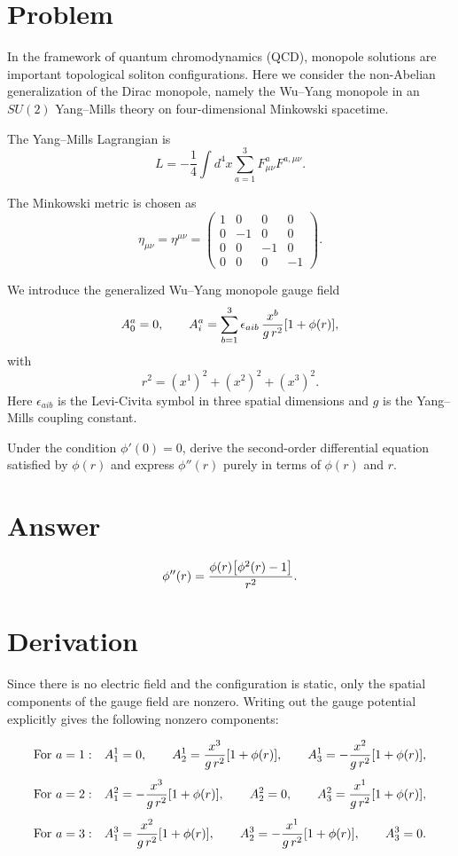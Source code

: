 \documentclass[12pt, a4paper]{article}
\begin{document}
\section*{Problem}

In the framework of quantum chromodynamics (QCD), monopole solutions are
important topological soliton configurations. Here we consider the non-Abelian
generalization of the Dirac monopole, namely the Wu--Yang monopole in an
$SU(2)$ Yang--Mills theory on four-dimensional Minkowski spacetime.

The Yang--Mills Lagrangian is
\[
L = -\frac{1}{4} \int d^4 x \sum_{a=1}^{3} F^a_{\mu\nu} F^{a,\mu\nu}.
\]

The Minkowski metric is chosen as
\[
\eta_{\mu\nu} = \eta^{\mu\nu}
=
\begin{pmatrix}
1 & 0 & 0 & 0 \\
0 & -1 & 0 & 0 \\
0 & 0 & -1 & 0 \\
0 & 0 & 0 & -1
\end{pmatrix}.
\]

We introduce the generalized Wu--Yang monopole gauge field
\[
A_0^a = 0,
\qquad
A_i^a = \sum_{b=1}^{3} \epsilon_{aib}\,\frac{x^b}{g\,r^2}\qty[1 + \phi(r)],
\]
with
\[
r^2 = (x^1)^2 + (x^2)^2 + (x^3)^2.
\]
Here $\epsilon_{aib}$ is the Levi-Civita symbol in three spatial dimensions
and $g$ is the Yang--Mills coupling constant.

Under the condition $\phi'(0)=0$, derive the second-order differential
equation satisfied by $\phi(r)$ and express $\phi''(r)$ purely in terms of
$\phi(r)$ and $r$.

\section*{Answer}

\[
\phi''(r) = \frac{\phi(r)\qty[\phi^2(r)-1]}{r^2}.
\]

\section*{Derivation}

Since there is no electric field and the configuration is static, only the
spatial components of the gauge field are nonzero. Writing out the gauge
potential explicitly gives the following nonzero components:

\[
\begin{aligned}
&\text{For } a=1: &&
A_1^1 = 0, \qquad
A_2^1 = \frac{x^3}{g\,r^2}\qty[1+\phi(r)], \qquad
A_3^1 = -\frac{x^2}{g\,r^2}\qty[1+\phi(r)], \\[4pt]
&\text{For } a=2: &&
A_1^2 = -\frac{x^3}{g\,r^2}\qty[1+\phi(r)], \qquad
A_2^2 = 0, \qquad
A_3^2 = \frac{x^1}{g\,r^2}\qty[1+\phi(r)], \\[4pt]
&\text{For } a=3: &&
A_1^3 = \frac{x^2}{g\,r^2}\qty[1+\phi(r)], \qquad
A_2^3 = -\frac{x^1}{g\,r^2}\qty[1+\phi(r)], \qquad
A_3^3 = 0.
\end{aligned}
\]
\end{document}
